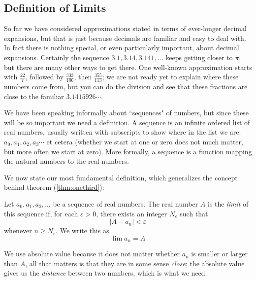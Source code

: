 \subsection{Definition of Limits}
So far we have considered approximations stated in terms of ever-longer decimal expansions, but that is just because decimals are  familiar and easy to deal with. In fact there is nothing special, or even particularly important, about decimal expansions. Certainly the sequence $3.1, 3.14, 3.141, \ldots$ keeps getting closer to $\pi$, but there are many other ways to get there. One well-known approximation starts with $\frac{22}{7}$, followed by $\frac{333}{106}$, then $\frac{355}{113}$; we are not ready yet to explain where these numbers come from, but you can do the division and see that these fractions are close to the familiar $3.1415926\cdots$.

We have been speaking informally about ``sequences" of numbers, but since these will be so important we need a definition. A sequence is an infinite ordered list of real numbers, usually written with subscripts to show where in the list we are: $a_0,a_1, a_2, a_3 \cdots$ et cetera (whether we start at one or zero does not much matter, but more often we start at zero). More formally, a sequence is a function mapping the natural numbers to the real numbers.

We now state our most fundamental definition, which generalizes the concept behind theorem (\ref{thm:onethird}):
\begin{defn}\label{def:limit}
Let $a_0,a_1,a_2,\ldots$ be a sequence of real numbers. The real number $A$ is the \emph{limit} of this sequence if,
for each $\varepsilon > 0$, there exists an integer $N_\varepsilon$ such that
\[
|A - a_n| < \varepsilon 
\]
whenever $n \geq N_\varepsilon$. We write this as
\[
\lim a_n = A
\]
\end{defn}
We use absolute value because it does not matter whether $a_n$ is smaller or larger than $A$, all that matters is that they are in some sense \emph{close}; the absolute value gives us the \emph{distance} between two numbers, which is what we need. 


